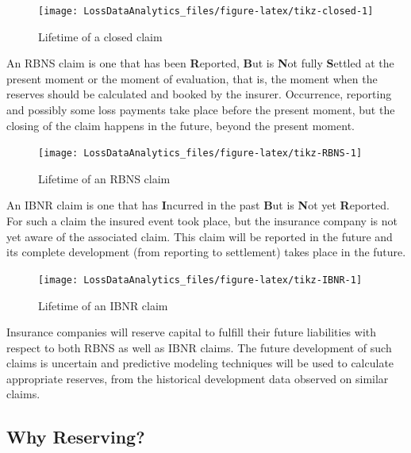 \documentclass[]{book}
\begin{document}
\begin{figure}

{\centering \texttt{[image: LossDataAnalytics\_files/figure-latex/tikz-closed-1]} 

}

\caption{Lifetime of a closed claim}\label{fig:tikz-closed}
\end{figure}

An RBNS claim is one that has been \textbf{R}eported, \textbf{B}ut is
\textbf{N}ot fully \textbf{S}ettled at the present moment or the moment
of evaluation, that is, the moment when the reserves should be
calculated and booked by the insurer. Occurrence, reporting and possibly
some loss payments take place before the present moment, but the closing
of the claim happens in the future, beyond the present moment.

\begin{figure}

{\centering \texttt{[image: LossDataAnalytics\_files/figure-latex/tikz-RBNS-1]} 

}

\caption{Lifetime of an RBNS claim}\label{fig:tikz-RBNS}
\end{figure}

An IBNR claim is one that has \textbf{I}ncurred in the past \textbf{B}ut
is \textbf{N}ot yet \textbf{R}eported. For such a claim the insured
event took place, but the insurance company is not yet aware of the
associated claim. This claim will be reported in the future and its
complete development (from reporting to settlement) takes place in the
future.

\begin{figure}

{\centering \texttt{[image: LossDataAnalytics\_files/figure-latex/tikz-IBNR-1]} 

}

\caption{Lifetime of an IBNR claim}\label{fig:tikz-IBNR}
\end{figure}

Insurance companies will reserve capital to fulfill their future
liabilities with respect to both RBNS as well as IBNR claims. The future
development of such claims is uncertain and predictive modeling
techniques will be used to calculate appropriate reserves, from the
historical development data observed on similar claims.

\subsection{Why Reserving?}\label{why-reserving}
\end{document}
